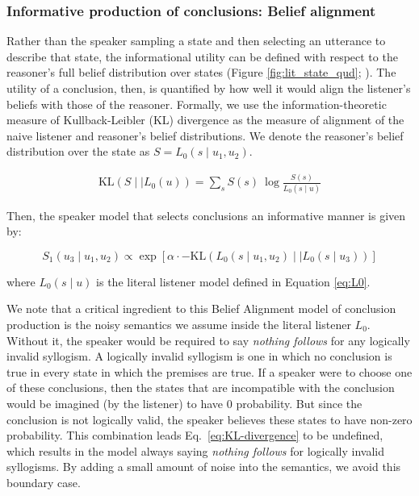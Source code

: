 \documentclass[floatsintext, doc]{apa6}
\begin{document}
\subsubsection{Informative production of conclusions: Belief alignment}

Rather than the speaker sampling a state and then selecting an utterance to describe that state, the informational utility can be defined with respect to the reasoner's full belief distribution over states (Figure \ref{fig:lit_state_qud}; ). 
The utility of a conclusion, then, is quantified by how well it would align the listener's beliefs with those of the reasoner. 
Formally, we use the information-theoretic measure of Kullback-Leibler (KL) divergence as the measure of alignment of the naive listener and reasoner's belief distributions. 
We denote the reasoner's belief distribution over the state as $S= L_0(s \mid  u_1,u_2)$. 

\begin{align}
  \label{eq:KL-divergence}
  \text{KL}({ S \mid \mid L_0}(u)) = \sum_{s}  S(s) \ \log \frac{ S(s)}{{L_{0}}(s \mid u)}
\end{align}

\noindent Then, the speaker model that selects conclusions an informative manner is given by: 

\begin{equation}
S_1(u_3 \mid u_1,  u_2) \propto  \exp [ \alpha \cdot - \text{KL}({ L_0(s \mid  u_1,u_2) \mid \mid L_0}(s \mid u_3)) ]  \label{eq:R1b}
\end{equation}

\noindent where $L_0(s \mid u)$ is the literal listener model defined in Equation \ref{eq:L0}. 

We note that a critical ingredient to this Belief Alignment model of conclusion production is the noisy semantics we assume inside the literal listener $L_0$.
Without it, the speaker would be required to say \emph{nothing follows} for any logically invalid syllogism. 
A logically invalid syllogism is one in which no conclusion is true in every state in which the premises are true.
If a speaker were to choose one of these conclusions, then the states that are incompatible with the conclusion would be imagined (by the listener) to have 0 probability. 
But since the conclusion is not logically valid, the speaker believes these states to have non-zero probability.
This combination leads Eq.~\ref{eq:KL-divergence} to be undefined, which results in the model always saying \emph{nothing follows} for logically invalid syllogisms.
By adding a small amount of noise into the semantics, we avoid this boundary case.
\end{document}
